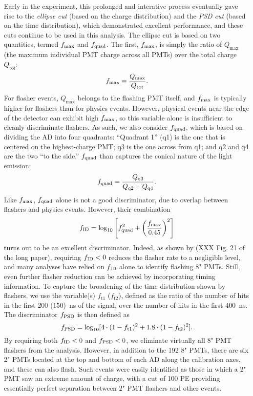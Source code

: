 \documentclass[../thesis.tex]{subfiles}
\begin{document}
Early in the experiment, this prolonged and interative process eventually gave
rise to the \emph{ellipse cut} (based on the charge distribution) and the
\emph{PSD cut} (based on the time distribution), which demonstrated excellent
performance, and these cuts continue to be used in this analysis. The ellipse
cut is based on two quantities, termed $f_{\mathrm{max}}$ and $f_{\mathrm{quad}}$. The first, $f_{\mathrm{max}}$,
is simply the ratio of $Q_{\mathrm{max}}$ (the maximum individual PMT charge
across all PMTs) over the total charge $Q_{\mathrm{tot}}$:
\begin{equation*}
  f_{\mathrm{max}} = \frac{Q_{\mathrm{max}}}{Q_{\mathrm{tot}}}.
\end{equation*}
For flasher events, $Q_{\mathrm{max}}$ belongs to the flashing PMT itself, and
$f_{\mathrm{max}}$ is typically higher for flashers than for physics events. However,
physical events near the edge of the detector can exhibit high $f_{\mathrm{max}}$, so this
variable alone is insufficient to cleanly discriminate flashers. As such, we
also consider $f_{\mathrm{quad}}$, which is based on dividing the AD into four quadrants:
``Quadrant 1'' (q1) is the one that is centered on the highest-charge PMT; q3 is
the one across from q1; and q2 and q4 are the two ``to the side.'' $f_{\mathrm{quad}}$ than
captures the conical nature of the light emission:
\begin{equation*}
  f_{\mathrm{quad}} = \frac{Q_{\mathrm{q3}}}{Q_{\mathrm{q2}} + Q_{\mathrm{q4}}}.
\end{equation*}
Like $f_{\mathrm{max}}$, $f_{\mathrm{quad}}$ alone is not a good discriminator, due to overlap between
flashers and physics events. However, their combination
\begin{equation*}
  f_{\mathrm{ID}} = \log_{10} \left[ f_{\mathrm{quad}}^2 + \left( \frac{f_{\mathrm{max}}}{0.45} \right)^2 \right]
\end{equation*}
turns out to be an excellent discriminator. Indeed, as shown by (XXX Fig. 21 of
the long paper), requiring $f_{\mathrm{ID}} < 0$ reduces the flasher rate to a negligible
level, and many analyses have relied on $f_{\mathrm{ID}}$ alone to identify flashing 8"
PMTs. Still, even further flasher reduction can be achieved by incorporating
timing information. To capture the broadening of the time distribution shown by
flashers, we use the variable(s) $f_{\mathrm{t}1}$ ($f_{\mathrm{t}2}$), defined
as the ratio of the number of hits in the first 200 (150)~ns of the signal, over
the number of hits in the first 400~ns. The discriminator $f_{\mathrm{PSD}}$ is then
defined as
\begin{equation*}
  f_{\mathrm{PSD}} = \log_{10} [4 \cdot (1 - f_{\mathrm{t}1})^2 + 1.8 \cdot (1 - f_{\mathrm{t}2})^2].
\end{equation*}
By requiring both $f_{\mathrm{ID}} < 0$ and $f_{\mathrm{PSD}} < 0$, we eliminate virtually all 8" PMT
flashers from the analysis. However, in addition to the 192 8" PMTs, there are
six 2" PMTs located at the top and bottom of each AD along the calibration axes,
and these can also flash. Such events were easily identified as those in which a
2" PMT saw an extreme amount of charge, with a cut of 100 PE providing
essentially perfect separation between 2" PMT flashers and other events.
\end{document}
